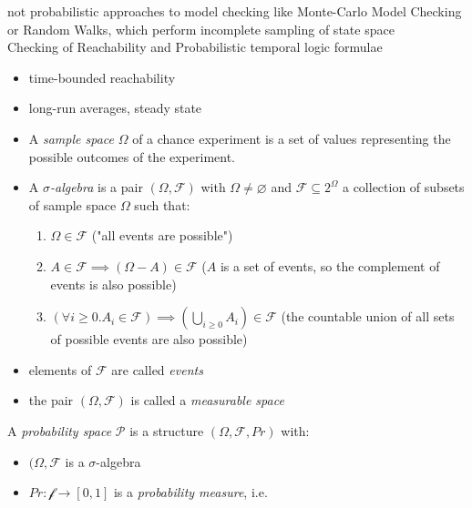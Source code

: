 \documentclass[a4paper, 10pt]{article}
\begin{document}
\begin{mdframed}[roundcorner=5pt,
subtitlebelowline=false,subtitleaboveline=false,
subtitlebackgroundcolor=blue!30,
frametitlerule=true,
frametitlebackgroundcolor=blue!30,
frametitle={Probabilistic Model Checking}
]
{\tiny not probabilistic approaches to model checking like Monte-Carlo Model Checking or Random Walks, which perform incomplete sampling of state space} \\
Checking of Reachability and Probabilistic temporal logic formulae
\begin{itemize}
    \item time-bounded reachability
    \item long-run averages, steady state
\end{itemize}
\begin{itemize}
    \item A \emph{sample space} $\Omega$ of a chance experiment is a set of values representing the possible outcomes of the experiment.
    \item A \emph{$\sigma$-algebra} is a pair $(\Omega,\mathcal{F})$ with $\Omega\not=\varnothing$ and $\mathcal{F}\subseteq2^\Omega$ a collection of subsets of sample space $\Omega$ such that:
    \begin{enumerate}
        \item $\Omega\in\mathcal{F}$ ("all events are possible")
        \item $A\in \mathcal{F}\implies (\Omega-A)\in\mathcal{F}$ ($A$ is a set of events, so the complement of events is also possible)
        \item $(\forall i\geq0.A_i\in\mathcal{F})\implies(\bigcup_{i\geq0} A_i)\in\mathcal{F}$ (the countable union of all sets of possible events are also possible)
    \end{enumerate}
    \item elements of $\mathcal{F}$ are called \emph{events}
    \item the pair $(\Omega,\mathcal{F})$ is called a \emph{measurable space}
\end{itemize}
A \emph{probability space} $\mathcal{P}$ is a structure $(\Omega,\mathcal{F},Pr)$ with:
\begin{itemize}
    \item $(\Omega,\mathcal{F}$ is a $\sigma$-algebra
    \item $Pr:\mathcal{f}\to[0,1]$ is a \emph{probability measure}, i.e.
    \begin{enumerate}

\end{enumerate}
\end{itemize}
\end{mdframed}
\end{document}
